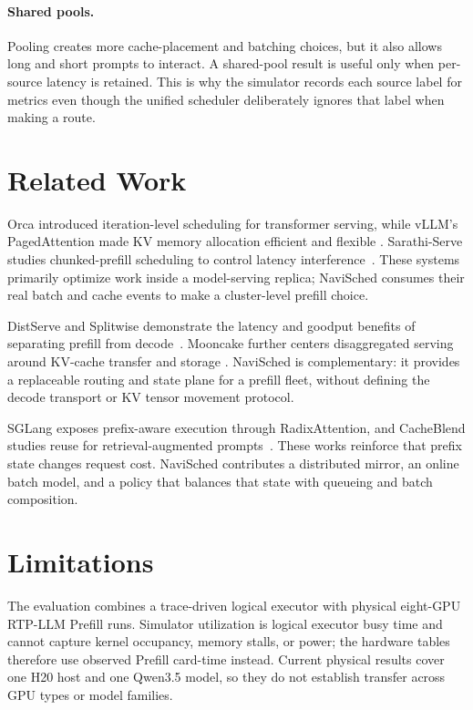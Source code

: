 \documentclass[10pt]{article}
\newcommand{\system}{NaviSched\xspace}
\begin{document}
\paragraph{Shared pools.}
Pooling creates more cache-placement and batching choices, but it also allows
long and short prompts to interact. A shared-pool result is useful only when
per-source latency is retained. This is why the simulator records each source
label for metrics even though the unified scheduler deliberately ignores that
label when making a route.

\section{Related Work}

Orca introduced iteration-level scheduling for transformer serving, while
vLLM's PagedAttention made KV memory allocation efficient and flexible
\cite{orca,vllm}. Sarathi-Serve studies chunked-prefill scheduling to control
latency interference~\cite{sarathi}. These systems primarily optimize work
inside a model-serving replica; \system consumes their real batch and cache
events to make a cluster-level prefill choice.

DistServe and Splitwise demonstrate the latency and goodput benefits of
separating prefill from decode~\cite{distserve,splitwise}. Mooncake further
centers disaggregated serving around KV-cache transfer and storage
\cite{mooncake}. \system is complementary: it provides a replaceable routing
and state plane for a prefill fleet, without defining the decode transport or
KV tensor movement protocol.

SGLang exposes prefix-aware execution through RadixAttention, and CacheBlend
studies reuse for retrieval-augmented prompts~\cite{sglang,cacheblend}. These
works reinforce that prefix state changes request cost. \system contributes a
distributed mirror, an online batch model, and a policy that balances that
state with queueing and batch composition.

\section{Limitations}

The evaluation combines a trace-driven logical executor with physical
eight-GPU RTP-LLM Prefill runs. Simulator utilization is logical executor busy
time and cannot capture kernel occupancy, memory stalls, or power; the
hardware tables therefore use observed Prefill card-time instead. Current
physical results cover one H20 host and one Qwen3.5 model, so they do not
establish transfer across GPU types or model families.
\end{document}
